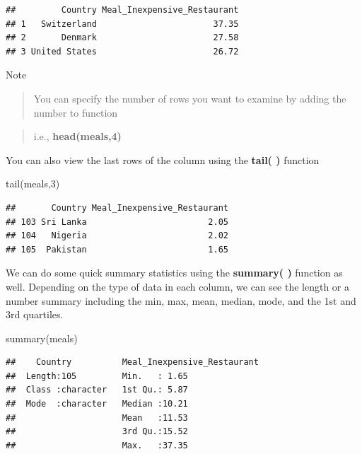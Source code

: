 \documentclass[
]{book}
\newenvironment{Shaded}{\begin{snugshade}}{\end{snugshade}}
\newcommand{\DecValTok}[1]{\textcolor[rgb]{0.00,0.00,0.81}{#1}}
\newcommand{\FunctionTok}[1]{\textcolor[rgb]{0.00,0.00,0.00}{#1}}
\newcommand{\NormalTok}[1]{#1}
\begin{document}
\begin{verbatim}
##         Country Meal_Inexpensive_Restaurant
## 1   Switzerland                       37.35
## 2       Denmark                       27.58
## 3 United States                       26.72
\end{verbatim}

Note

\begin{quote}
You can specify the number of rows you want to examine by adding the number to function
\end{quote}

\begin{quote}
i.e., \textbf{head(meals,4)}
\end{quote}

You can also view the last rows of the column using the \textbf{tail( )} function

\begin{Shaded}
\begin{Highlighting}[]
\FunctionTok{tail}\NormalTok{(meals,}\DecValTok{3}\NormalTok{)}
\end{Highlighting}
\end{Shaded}

\begin{verbatim}
##       Country Meal_Inexpensive_Restaurant
## 103 Sri Lanka                        2.05
## 104   Nigeria                        2.02
## 105  Pakistan                        1.65
\end{verbatim}

We can do some quick summary statistics using the \textbf{summary( )} function as well. Depending on the type of data in each column, we can see the length or a number summary including the min, max, mean, median, mode, and the 1st and 3rd quartiles.

\begin{Shaded}
\begin{Highlighting}[]
\FunctionTok{summary}\NormalTok{(meals)}
\end{Highlighting}
\end{Shaded}

\begin{verbatim}
##    Country          Meal_Inexpensive_Restaurant
##  Length:105         Min.   : 1.65              
##  Class :character   1st Qu.: 5.87              
##  Mode  :character   Median :10.21              
##                     Mean   :11.53              
##                     3rd Qu.:15.52              
##                     Max.   :37.35
\end{verbatim}
\end{document}
